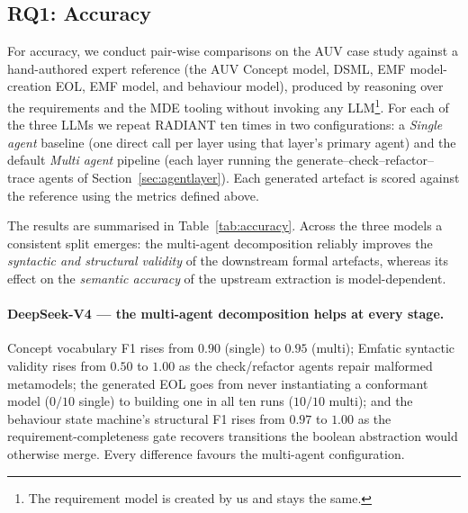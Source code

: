 \subsection{RQ1: Accuracy}
For accuracy, we conduct pair-wise comparisons on the AUV case study against a hand-authored expert reference (the AUV Concept model, DSML, EMF model-creation EOL, EMF model, and behaviour model), produced by reasoning over the requirements and the MDE tooling without invoking any LLM\footnote{The requirement model is created by us and stays the same.}.
For each of the three LLMs we repeat RADIANT ten times in two configurations: a \textit{Single agent} baseline (one direct call per layer using that layer's primary agent) and the default \textit{Multi agent} pipeline (each layer running the generate--check--refactor--trace agents of Section~\ref{sec:agentlayer}).
Each generated artefact is scored against the reference using the metrics defined above.

The results are summarised in Table~\ref{tab:accuracy}.
Across the three models a consistent split emerges: the multi-agent decomposition reliably improves the \emph{syntactic and structural validity} of the downstream formal artefacts, whereas its effect on the \emph{semantic accuracy} of the upstream extraction is model-dependent.

\paragraph{DeepSeek-V4 --- the multi-agent decomposition helps at every stage.} Concept vocabulary F1 rises from $0.90$ (single) to $0.95$ (multi); Emfatic syntactic validity rises from $0.50$ to $1.00$ as the check/refactor agents repair malformed metamodels; the generated EOL goes from never instantiating a conformant model ($0/10$ single) to building one in all ten runs ($10/10$ multi); and the behaviour state machine's structural F1 rises from $0.97$ to $1.00$ as the requirement-completeness gate recovers transitions the boolean abstraction would otherwise merge.
Every difference favours the multi-agent configuration.

